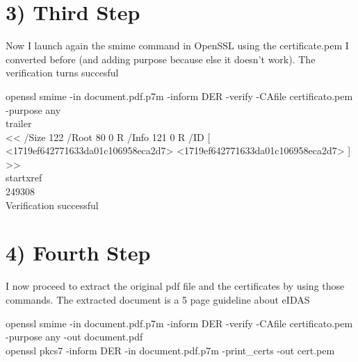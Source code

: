 \documentclass{article}
\begin{document}
\section*{3) Third Step}
Now I launch again the smime command in OpenSSL using the certificate.pem I converted before (and adding purpose because else it doesn't work). The verification turns succesful\\

\begin{tcolorbox} [title=OpenSSL dialogue box]
openssl smime -in document.pdf.p7m -inform DER -verify -CAfile certificato.pem -purpose any\\

trailer\\
<< /Size 122 /Root 80 0 R /Info 121 0 R /ID [ <1719ef642771633da01c106958eca2d7>
<1719ef642771633da01c106958eca2d7> ] >>\\
startxref\\
249308\\
Verification successful
\end{tcolorbox}

\section*{4) Fourth Step}
I now proceed to extract the original pdf file and the certificates by using those commands. The extracted document is a 5 page guideline about eIDAS\\

\begin{tcolorbox} [title=OpenSSL dialogue box]
openssl smime -in document.pdf.p7m -inform DER -verify -CAfile certificato.pem -purpose any -out document.pdf\\

openssl pkcs7 -inform DER -in document.pdf.p7m -print_certs -out cert.pem\\
\end{tcolorbox}
\end{document}
